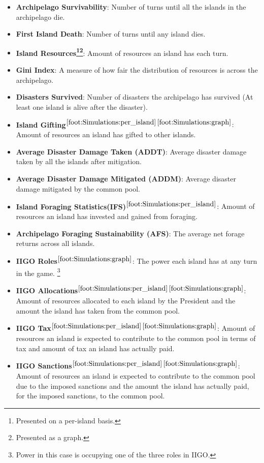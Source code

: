 \begin{itemize}
    \item \textbf{Archipelago Survivability}: Number of turns until all the islands in the archipelago die.
    \item \textbf{First Island Death}: Number of turns until any island dies.
    \item \textbf{Island Resources\footnote{\label{foot:Simulations:per_island}Presented on a per-island basis.}\footnote{\label{foot:Simulations:graph}Presented as a graph.}}: Amount of resources an island has each turn.
    \item \textbf{Gini Index}: A measure of how fair the distribution of resources is across the archipelago.
    \item \textbf{Disasters Survived}: Number of disasters the archipelago has survived (At least one island is alive after the disaster).
    \item \textbf{Island Gifting$^{\ref{foot:Simulations:per_island}}$$^{\ref{foot:Simulations:graph}}$}: Amount of resources an island has gifted to other islands.
    \item \textbf{Average Disaster Damage Taken (ADDT)}: Average disaster damage taken by all the islands after mitigation.
    \item \textbf{Average Disaster Damage Mitigated (ADDM)}: Average disaster damage mitigated by the common pool.
    \item \textbf{Island Foraging Statistics(IFS)$^{\ref{foot:Simulations:per_island}}$}: Amount of resources an island has invested and gained from foraging.
    \item \textbf{Archipelago Foraging Sustainability (AFS)}: The average net forage returns across all islands.
    \item \textbf{IIGO Roles$^{\ref{foot:Simulations:graph}}$}: The power each island has at any turn in the game. \footnote{Power in this case is occupying one of the three roles in IIGO.}
    \item \textbf{IIGO Allocations$^{\ref{foot:Simulations:per_island}}$$^{\ref{foot:Simulations:graph}}$}: Amount of resources allocated to each island by the President and the amount the island has taken from the common pool.
    \item \textbf{IIGO Tax$^{\ref{foot:Simulations:per_island}}$$^{\ref{foot:Simulations:graph}}$}: Amount of resources an island is expected to contribute to the common pool in terms of tax and amount of tax an island has actually paid.
    \item \textbf{IIGO Sanctions$^{\ref{foot:Simulations:per_island}}$$^{\ref{foot:Simulations:graph}}$}: Amount of resources an island is expected to contribute to the common pool due to the imposed sanctions and the amount the island has actually paid, for the imposed sanctions, to the common pool.
    
\end{itemize}

